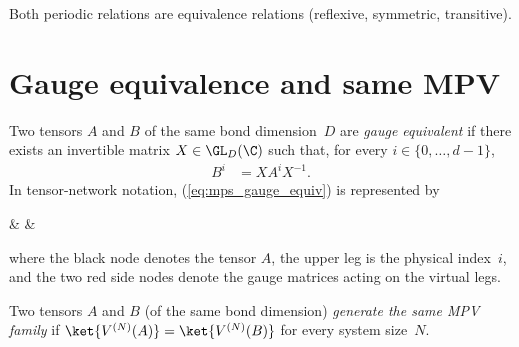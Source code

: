\begin{lemma}\label{lem:periodic_relation_equivalences}
    \leanok
    Both periodic relations are equivalence relations (reflexive,
    symmetric, transitive).
\end{lemma}

\section{Gauge equivalence and same MPV}

\begin{definition}\label{def:gauge_equiv}
    \leanok
    Two tensors $A$ and $B$ of the same bond dimension~$D$ are
    \emph{gauge equivalent} if there exists an invertible matrix
    $X \in \GL_D(\C)$ such that, for every $i \in \{0,\ldots,d{-}1\}$,
    \begin{align}
        B^i
         & = X A^i X^{-1}.
        \label{eq:mps_gauge_equiv}
    \end{align}
    In tensor-network notation, (\ref{eq:mps_gauge_equiv}) is represented by
    \begin{center}
        \tenkzkernel
        \begin{tenkz}[boundary=open]
             &  &
        \end{tenkz}
    \end{center}
    where the black node denotes the tensor $A$, the upper leg is the physical
    index~$i$, and the two red side nodes denote the gauge matrices acting on
    the virtual legs.
\end{definition}

\begin{definition}\label{def:same_mpv}
    \leanok
    Two tensors $A$ and $B$ (of the same bond dimension)
    \emph{generate the same MPV family}
    if $\ket{V^{(N)}(A)} = \ket{V^{(N)}(B)}$ for every system size~$N$.
\end{definition}

